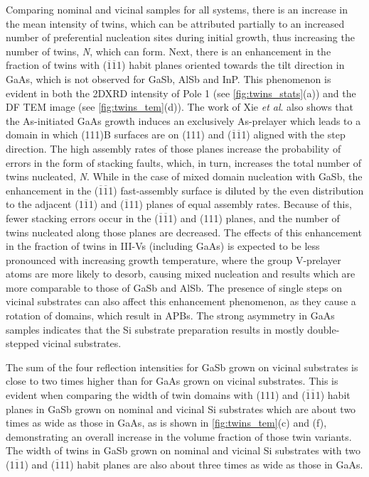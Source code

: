 Comparing nominal and vicinal samples for all systems, there is an increase in the mean intensity of twins, which can be attributed partially to an increased number of preferential nucleation sites during initial growth, thus increasing the number of twins, \textit{N}, which can form. Next, there is an enhancement in the fraction of twins with ($\overline{1}\overline{1}$1) habit planes oriented towards the tilt direction in GaAs, which is not observed for GaSb, AlSb and InP. This phenomenon is evident in both the 2DXRD intensity of Pole 1 (see \cref{fig:twins_stats}(a)) and the DF TEM image (see \cref{fig:twins_tem}(d)). The work of Xie \textit{et al}. also shows that the As-initiated GaAs growth induces an exclusively As-prelayer which leads to a domain in which (111)B surfaces are on (111) and ($\overline{1}\overline{1}$1) aligned with the step direction. The high assembly rates of those planes increase the probability of errors in the form of stacking faults, which, in turn, increases the total number of twins nucleated, \textit{N}. While in the case of mixed domain nucleation with GaSb, the enhancement in the ($\overline{1}\overline{1}$1) fast-assembly surface is diluted by the even distribution to the adjacent (1$\overline{1}$1) and ($\overline{1}$11) planes of equal assembly rates. Because of this, fewer stacking errors occur in the ($\overline{1}\overline{1}$1) and (111) planes, and the number of twins nucleated along those planes are decreased. The effects of this enhancement in the fraction of twins in III-Vs (including GaAs) is expected to be less pronounced with increasing growth temperature, where the group V-prelayer atoms are more likely to desorb, causing mixed nucleation and results which are more comparable to those of GaSb and AlSb. The presence of single steps on vicinal substrates can also affect this enhancement phenomenon, as they cause a rotation of domains, which result in APBs. The strong asymmetry in GaAs samples indicates that the Si substrate preparation results in mostly double-stepped vicinal substrates.

The sum of the four reflection intensities for GaSb grown on vicinal substrates is close to two times higher than for GaAs grown on vicinal substrates. This is evident when comparing the width of twin domains with (111) and ($\overline{1}\overline{1}$1) habit planes in GaSb grown on nominal and vicinal Si substrates which are about two times as wide as those in GaAs, as is shown in \cref{fig:twins_tem}(c) and (f), demonstrating an overall increase in the volume fraction of those twin variants. The width of twins in GaSb grown on nominal and vicinal Si substrates with two (1$\overline{1}$1) and ($\overline{1}$11) habit planes are also about three times as wide as those in GaAs.

